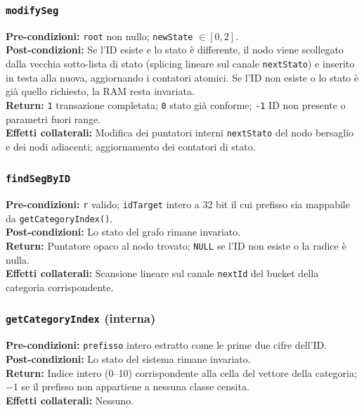 \documentclass[12pt, a4paper]{article}
\begin{document}
\subsubsection{\texttt{modifySeg}}
\vspace{3mm}
\begin{specbox}
\textbf{Pre-condizioni:} \texttt{root} non nullo; \texttt{newState} $\in [0, 2]$. \\
\textbf{Post-condizioni:} Se l'ID esiste e lo stato è differente, il nodo viene scollegato dalla vecchia sotto-lista di stato (splicing lineare sul canale \texttt{nextStato}) e inserito in testa alla nuova, aggiornando i contatori atomici. Se l'ID non esiste o lo stato è già quello richiesto, la RAM resta invariata. \\
\textbf{Return:} \texttt{1} transazione completata; \texttt{0} stato già conforme; \texttt{-1} ID non presente o parametri fuori range. \\
\textbf{Effetti collaterali:} Modifica dei puntatori interni \texttt{nextStato} del nodo bersaglio e dei nodi adiacenti; aggiornamento dei contatori di stato.
\end{specbox}

\subsubsection{\texttt{findSegByID}}
\vspace{3mm}
\begin{specbox}
\textbf{Pre-condizioni:} \texttt{r} valido; \texttt{idTarget} intero a 32 bit il cui prefisso sia mappabile da \texttt{getCategoryIndex()}. \\
\textbf{Post-condizioni:} Lo stato del grafo rimane invariato. \\
\textbf{Return:} Puntatore opaco al nodo trovato; \texttt{NULL} se l'ID non esiste o la radice è nulla. \\
\textbf{Effetti collaterali:} Scansione lineare sul canale \texttt{nextId} del bucket della categoria corrispondente.
\end{specbox}

\subsubsection{\texttt{getCategoryIndex} (interna)}
\vspace{3mm}
\begin{specbox}
\textbf{Pre-condizioni:} \texttt{prefisso} intero estratto come le prime due cifre dell'ID. \\
\textbf{Post-condizioni:} Lo stato del sistema rimane invariato. \\
\textbf{Return:} Indice intero (0--10) corrispondente alla cella del vettore della categoria; $-1$ se il prefisso non appartiene a nessuna classe censita. \\
\textbf{Effetti collaterali:} Nessuno.
\end{specbox}
\end{document}

